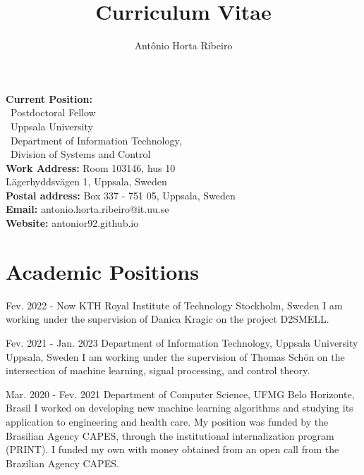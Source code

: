 \documentclass[10pt,letterpaper]{article} %
\title{Curriculum Vitae}
\author{Ant\^onio Horta Ribeiro}
\begin{document}
\maketitle

\begin{tcolorbox}[standard jigsaw, opacityback=0]
    \vspace{-4pt}
\begin{multicols}{2}
    \small
    \textbf{Current Position:}\\
    \, Postdoctoral Fellow\\
    \, Uppsala University \\
    \, Department of Information Technology,\\
    \, Division of Systems and Control\\
    {\bf Work Address:} Room 103146, hus 10 \\
    \phantom{\bf Work address:} Lägerhyddsvägen 1, Uppsala, Sweden\\
    {\bf Postal address:} Box 337 - 751 05, Uppsala, Sweden\\
    {\bf Email:} antonio.horta.ribeiro@it.uu.se\\
    {\bf Website:} antonior92.github.io
\end{multicols}
\end{tcolorbox}

\section*{Academic Positions} %


    { Fev. 2022 -   Now  }
    { KTH Royal Institute of Technology  }
    { Stockholm, Sweden  }
    { I am working under the supervision of Danica Kragic on the project D2SMELL.}

    { Fev. 2021 -   Jan. 2023  }
    { Department of Information Technology, Uppsala University  }
    { Uppsala, Sweden  }
    { I am working under the supervision of Thomas Schön on the intersection of machine learning, signal processing, and control theory.}

    { Mar. 2020 -   Fev. 2021  }
    { Department of Computer Science, UFMG  }
    { Belo Horizonte, Brasil  }
    { I worked on developing new machine learning algorithms and studying its application to engineering and health care. My position was funded by the Brasilian Agency CAPES, through the institutional internalization program (PRINT). I funded my own with money obtained from an open call from the Brazilian Agency CAPES.}
\end{document}
